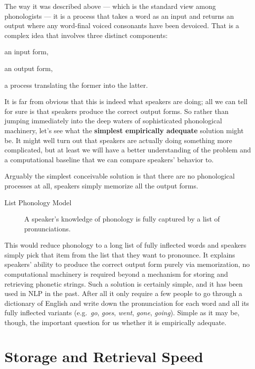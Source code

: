 The way it was described above --- which is the standard view among phonologists --- it is a process that takes a word as an input and returns an output where any word-final voiced consonants have been devoiced.
That is a complex idea that involves three distinct components:
%
\begin{enumerate*}
    \item an input form,
    \item an output form,
    \item a process translating the former into the latter.
\end{enumerate*}
%
It is far from obvious that this is indeed what speakers are doing; all we can tell for sure is that speakers produce the correct output forms.
So rather than jumping immediately into the deep waters of sophisticated phonological machinery, let's see what the \textbf{simplest empirically adequate} solution might be.
It might well turn out that speakers are actually doing something more complicated, but at least we will have a better understanding of the problem and a computational baseline that we can compare speakers' behavior to.

Arguably the simplest conceivable solution is that there are no phonological processes at all, speakers simply memorize all the output forms.
%
\begin{description}
    \item[List Phonology Model] A speaker's knowledge of phonology is fully captured by a list of pronunciations.
\end{description}
%
This would reduce phonology to a long list of fully inflected words and speakers simply pick that item from the list that they want to pronounce.
It explains speakers' ability to produce the correct output form purely via memorization, no computational machinery is required beyond a mechanism for storing and retrieving phonetic strings. 
Such a solution is certainly simple, and it has been used in NLP in the past.
After all it only require a few people to go through a dictionary of English and write down the pronunciation for each word and all its fully inflected variants (e.g.\ \emph{go}, \emph{goes}, \emph{went}, \emph{gone}, \emph{going}).
Simple as it may be, though, the important question for us whether it is empirically adequate.

\section{Storage and Retrieval Speed}

